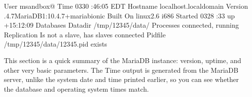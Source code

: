 \documentclass[letterpaper,10pt,english]{sphinxmanual}
\begin{document}
\begin{sphinxVerbatim}[commandchars=\\\{\}]
                     User  msandbox@\PYGZpc{}
                     Time  \PYGZhy{}03\PYGZhy{}30 :46:05 EDT
                 Hostname  localhost.localdomain
                  Version  .4.7\PYGZhy{}MariaDB\PYGZhy{}1:10.4.7+maria\PYGZti{}bionic
                 Built On  linux2.6 i686
                  Started  \PYGZhy{}03\PYGZhy{}28 :33 up +15:12:09
                Databases  
                  Datadir  /tmp/12345/data/
                Processes   connected,  running
              Replication  Is not a slave, has  slaves connected
                  Pidfile  /tmp/12345/data/12345.pid exists
\end{sphinxVerbatim}

\sphinxAtStartPar
This section is a quick summary of the MariaDB instance: version, uptime, and
other very basic parameters. The Time output is generated from the MariaDB server,
unlike the system date and time printed earlier, so you can see whether the
database and operating system times match.
\end{document}
